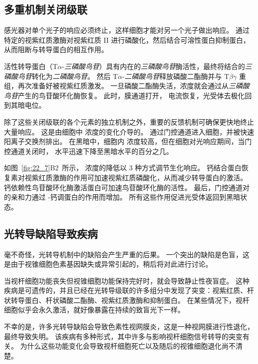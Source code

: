\subsection{多重机制关闭级联}

感光器对单个光子的响应必须终止，这样细胞才能对另一个光子做出响应。
通过特定的视紫红质激酶对视紫红质 II 进行磷酸化，然后结合可溶性蛋白抑制蛋白，从而阻断与转导蛋白的相互作用。


活性转导蛋白（T$\alpha$-\textit{三磷酸鸟苷}）具有内在的\textit{三磷酸鸟苷}酶活性，最终将结合的\textit{三磷酸鸟苷}转化为\textit{二磷酸鸟苷}。
然后 T$\alpha$-\textit{二磷酸鸟苷}释放磷酸二酯酶并与 T$\beta$$\gamma$ 重组，再次准备好被视紫红质激发。
一旦磷酸二酯酶失活，浓度就会通过从\textit{三磷酸鸟苷}产生的鸟苷酸环化酶恢复。
此时，膜通道打开， 电流恢复，光受体去极化回到其暗电位。


除了这些关闭级联的各个元素的独立机制之外，重要的反馈机制可确保更快地终止大量响应。
这是由细胞中  浓度的变化介导的。
通过门控通道进入细胞，并被快速阳离子交换剂排出。
在黑暗中，细胞内  浓度较高，但在细胞对光响应期间，当门控通道关闭时， 水平迅速下降至黑暗水平的百分之几。


如图~\ref{fig:22_7}B2~所示， 浓度的降低以 3 种方式调节生化响应。
钙结合蛋白恢复素对视紫红质激酶的作用可加速视紫红质磷酸化，从而减少转导蛋白的激活。
钙依赖性鸟苷酸环化酶激活蛋白可加速鸟苷酸环化酶的活性。
最后，门控通道对的亲和力通过 -钙调蛋白的作用而增加。
所有这些作用促进光受体返回到黑暗状态。



\subsection{光转导缺陷导致疾病}

毫不奇怪，光转导机制中的缺陷会产生严重的后果。
一个突出的缺陷是色盲，这是由于视锥细胞色素基因缺失或异常引起的，稍后将对此进行讨论。


当视杆细胞功能丧失但视锥细胞功能保持完好时，就会导致静止性夜盲症。
这种疾病是可遗传的，并且已经在光转导级联的许多组分中发现了突变：视紫红质、杆状转导蛋白、杆状磷酸二酯酶、视紫红质激酶和抑制蛋白。
在某些情况下，视杆细胞似乎会永久激活，就好像暴露在持续的致盲光下一样。


不幸的是，许多光转导缺陷会导致色素性视网膜炎，这是一种视网膜进行性退化，最终导致失明。
该疾病有多种形式，其中许多与影响视杆细胞信号转导的突变有关。
为什么这些功能变化会导致视杆细胞死亡以及随后的视锥细胞退化尚不清楚。



